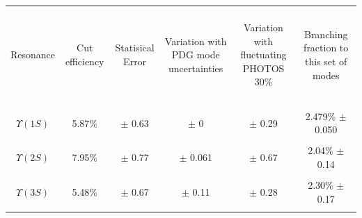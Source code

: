 \documentclass[landscape]{article}
\begin{document}
\begin{center}
  \begin{tabular}{c | c c c c | c}
    \hline\hline
    & & & & & \\
    \begin{minipage}{3 cm} \begin{center} Resonance \end{center} \end{minipage} &
    \begin{minipage}{2 cm} \begin{center} Cut efficiency \end{center} \end{minipage} &
    \begin{minipage}{2 cm} \begin{center} Statisical Error \end{center} \end{minipage} &
    \begin{minipage}{4 cm} \begin{center} Variation with PDG mode uncertainties \end{center} \end{minipage} &
    \begin{minipage}{4 cm} \begin{center} Variation with fluctuating PHOTOS 30\% \end{center} \end{minipage} &
    \begin{minipage}{3 cm} \begin{center} Branching fraction to this set of modes \end{center} \end{minipage} \\
    & & & & & \\\hline
    & & & & & \\
    $\Upsilon(1S)$ & 5.87\% & $\pm$ 0.63 & $\pm$ 0 & $\pm$ 0.29 & 2.479\% $\pm$ 0.050 \\
    & & & & & \\
    $\Upsilon(2S)$ & 7.95\% & $\pm$ 0.77 & $\pm$ 0.061 & $\pm$ 0.67 & 2.04\% $\pm$ 0.14 \\
    & & & & & \\
    $\Upsilon(3S)$ & 5.48\% & $\pm$ 0.67 & $\pm$ 0.11 & $\pm$ 0.28 & 2.30\% $\pm$ 0.17 \\
    & & & & & \\\hline\hline
  \end{tabular}
\end{center}
\end{document}
